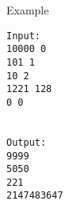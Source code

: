 Example
\begin{verbatim}
Input:
10000 0
101 1
10 2
1221 128
0 0


Output:
9999
5050
221
2147483647

\end{verbatim}